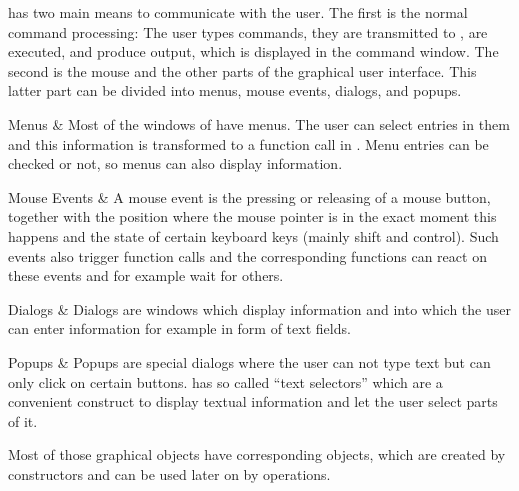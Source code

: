 
{\XGAP} has two main means to communicate with the user. The first is the
normal command processing: The user types commands, they are transmitted to 
{\GAP}, are executed, and produce output, which is displayed in the command
window. The second is the mouse and the other parts of the graphical user
interface. This latter part can be divided into menus, mouse events,
dialogs, and popups.

\beginitems
Menus & Most of the windows of {\XGAP} have menus. The user can select
entries in them and this information is transformed to a function call in
{\GAP}. Menu entries can be checked or not, so menus can also display
information. 

Mouse Events & A mouse event is the pressing or releasing of a mouse
button, together with the position where the mouse pointer is in the exact
moment this happens and the state of certain keyboard keys (mainly shift
and control). Such events also trigger {\GAP} function calls and the
corresponding functions can react on these events and for example wait for
others. 

Dialogs & Dialogs are windows which display information and into which
the user can enter information for example in form of text fields.

Popups & Popups are special dialogs where the user can not type text but
can only click on certain buttons. {\XGAP} has so called ``text selectors'' 
which are a convenient construct to display textual information and let the
user select parts of it.
\enditems

Most of those graphical objects have corresponding {\GAP} objects, which
are created by constructors and can be used later on by operations.


